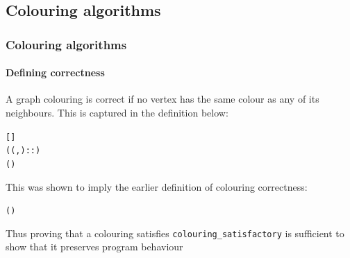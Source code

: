 \documentclass{beamer}
\begin{document}
\subsection{Colouring algorithms}

\begin{frame}[containsverbatim]
\frametitle{Colouring algorithms}
\framesubtitle{Defining correctness}
A graph colouring is correct if no vertex has the same colour as any of its neighbours. This is captured in the definition below:

\begin{alltt}\small
	  \HOLTokenEquiv{} 
  ((,)::) \HOLTokenEquiv{}
  \HOLTokenNotIn{}  (  ) \HOLTokenConj{}   
\end{alltt}

This was shown to imply the earlier definition of colouring correctness:

\begin{alltt}\small
	\HOLTokenTurnstile{}   \HOLTokenImp{}
     (  ) \HOLTokenImp{}
      
\end{alltt}

Thus proving that a colouring satisfies \texttt{colouring\_satisfactory} is sufficient to show that it preserves program behaviour
\end{frame}
\end{document}
